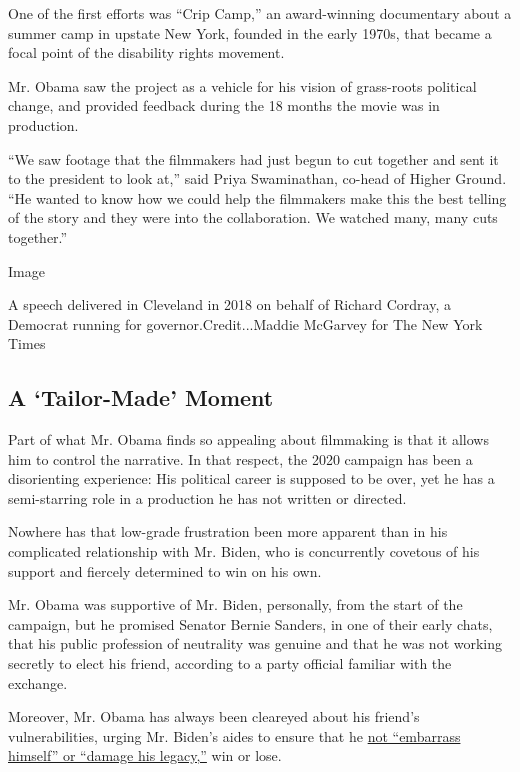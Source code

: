 One of the first efforts was ``Crip Camp,'' an award-winning documentary
about a summer camp in upstate New York, founded in the early 1970s,
that became a focal point of the disability rights movement.

Mr. Obama saw the project as a vehicle for his vision of grass-roots
political change, and provided feedback during the 18 months the movie
was in production.

``We saw footage that the filmmakers had just begun to cut together and
sent it to the president to look at,'' said Priya Swaminathan, co-head
of Higher Ground. ``He wanted to know how we could help the filmmakers
make this the best telling of the story and they were into the
collaboration. We watched many, many cuts together.''

Image

A speech delivered in Cleveland in 2018 on behalf of Richard Cordray, a
Democrat running for governor.Credit...Maddie McGarvey for The New York
Times

\hypertarget{a-tailor-made-moment}{%
\subsection{A `Tailor-Made' Moment}\label{a-tailor-made-moment}}

Part of what Mr. Obama finds so appealing about filmmaking is that it
allows him to control the narrative. In that respect, the 2020 campaign
has been a disorienting experience: His political career is supposed to
be over, yet he has a semi-starring role in a production he has not
written or directed.

Nowhere has that low-grade frustration been more apparent than in his
complicated relationship with Mr. Biden, who is concurrently covetous of
his support and fiercely determined to win on his own.

Mr. Obama was supportive of Mr. Biden, personally, from the start of the
campaign, but he promised Senator Bernie Sanders, in one of their early
chats, that his public profession of neutrality was genuine and that he
was not working secretly to elect his friend, according to a party
official familiar with the exchange.

Moreover, Mr. Obama has always been cleareyed about his friend's
vulnerabilities, urging Mr. Biden's aides to ensure that he
\href{https://www.nytimes.com/2019/08/16/us/politics/biden-obama-history.html}{not
``embarrass himself'' or ``damage his legacy,''} win or lose.

